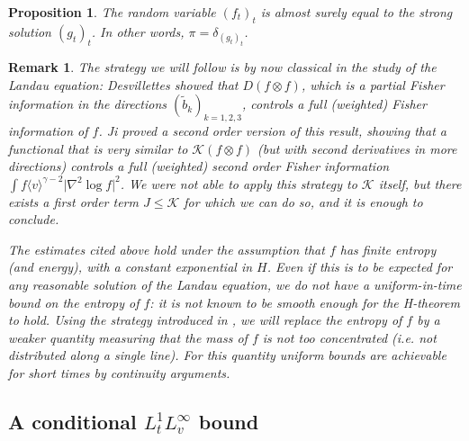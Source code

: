 \documentclass[11pt,a4paper]{article}
\theoremstyle{definition}
\theoremstyle{plain}
\newtheorem{prop}[defi]{Proposition}
\newtheorem{remark}[defi]{Remark}
\newcommand{\jap}[1]{\langle #1 \rangle}
\begin{document}
\begin{prop}
    \label{prop:asfequalg}
    The random variable $(f_t)_t$ is almost surely equal to the strong solution $(g_t)_t$. In other words, $\pi=\delta_{(g_t)_t}$.
\end{prop}

\begin{remark}
    The strategy we will follow is by now classical in the study of the Landau equation: Desvillettes \cite{Desvillettes2014a} showed that $D(f \otimes f)$, which is a partial Fisher information in the directions $(\tilde{b}_k)_{k=1,2,3}$, controls a full (weighted) Fisher information of $f$. Ji \cite{Ji2024} proved a second order version of this result, showing that a functional that is very similar to $\mathcal{K}(f\otimes f)$ (but with second derivatives in more directions) controls a full (weighted) second order Fisher information $\int f\jap{v}^{\gamma-2}\vert \nabla^2 \log f\vert^2$. We were not able to apply this strategy to $\mathcal{K}$ itself, but there exists a first order term $J\leq \mathcal{K}$ for which we can do so, and it is enough to conclude.
    
    The estimates cited above hold under the assumption that $f$ has finite entropy (and energy), with a constant exponential in $H$. Even if this is to be expected for any reasonable solution of the Landau equation, we do not have a uniform-in-time bound on the entropy of $f$: it is not known to be smooth enough for the H-theorem to hold. Using the strategy introduced in \cite{FournierHauray2015}, we will replace the entropy of $f$ by a weaker quantity measuring that the mass of $f$ is not too concentrated (\textit{i.e.} not distributed along a single line). For this quantity uniform bounds are achievable for short times by continuity arguments.
\end{remark}

\subsection{A conditional $L^1_t L^\infty_v$ bound}
\end{document}
